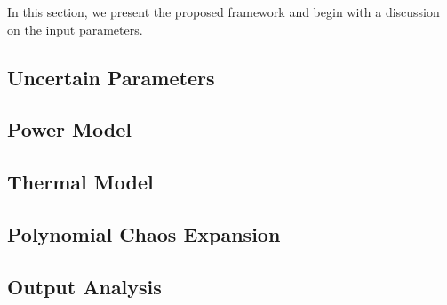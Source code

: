 In this section, we present the proposed framework and begin with a discussion on the input parameters.

\subsection{Uncertain Parameters} 


\subsection{Power Model} 


\subsection{Thermal Model} 


\subsection{Polynomial Chaos Expansion} 


\subsection{Output Analysis}

